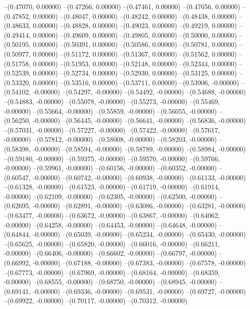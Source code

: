 --(0.47070, 0.00000)
--(0.47266, 0.00000)
--(0.47461, 0.00000)
--(0.47656, 0.00000)
--(0.47852, 0.00000)
--(0.48047, 0.00000)
--(0.48242, 0.00000)
--(0.48438, 0.00000)
--(0.48633, 0.00000)
--(0.48828, 0.00000)
--(0.49023, 0.00000)
--(0.49219, 0.00000)
--(0.49414, 0.00000)
--(0.49609, 0.00000)
--(0.49805, 0.00000)
--(0.50000, 0.00000)
--(0.50195, 0.00000)
--(0.50391, 0.00000)
--(0.50586, 0.00000)
--(0.50781, 0.00000)
--(0.50977, 0.00000)
--(0.51172, 0.00000)
--(0.51367, 0.00000)
--(0.51562, 0.00000)
--(0.51758, 0.00000)
--(0.51953, 0.00000)
--(0.52148, 0.00000)
--(0.52344, 0.00000)
--(0.52539, 0.00000)
--(0.52734, 0.00000)
--(0.52930, 0.00000)
--(0.53125, 0.00000)
--(0.53320, 0.00000)
--(0.53516, 0.00000)
--(0.53711, 0.00000)
--(0.53906, -0.00000)
--(0.54102, -0.00000)
--(0.54297, -0.00000)
--(0.54492, -0.00000)
--(0.54688, -0.00000)
--(0.54883, -0.00000)
--(0.55078, -0.00000)
--(0.55273, -0.00000)
--(0.55469, -0.00000)
--(0.55664, -0.00000)
--(0.55859, -0.00000)
--(0.56055, -0.00000)
--(0.56250, -0.00000)
--(0.56445, -0.00000)
--(0.56641, -0.00000)
--(0.56836, -0.00000)
--(0.57031, -0.00000)
--(0.57227, -0.00000)
--(0.57422, -0.00000)
--(0.57617, -0.00000)
--(0.57812, -0.00000)
--(0.58008, -0.00000)
--(0.58203, -0.00000)
--(0.58398, -0.00000)
--(0.58594, -0.00000)
--(0.58789, -0.00000)
--(0.58984, -0.00000)
--(0.59180, -0.00000)
--(0.59375, -0.00000)
--(0.59570, -0.00000)
--(0.59766, -0.00000)
--(0.59961, -0.00000)
--(0.60156, -0.00000)
--(0.60352, -0.00000)
--(0.60547, -0.00000)
--(0.60742, -0.00000)
--(0.60938, -0.00000)
--(0.61133, -0.00000)
--(0.61328, -0.00000)
--(0.61523, -0.00000)
--(0.61719, -0.00000)
--(0.61914, -0.00000)
--(0.62109, -0.00000)
--(0.62305, -0.00000)
--(0.62500, -0.00000)
--(0.62695, -0.00000)
--(0.62891, -0.00000)
--(0.63086, -0.00000)
--(0.63281, -0.00000)
--(0.63477, -0.00000)
--(0.63672, -0.00000)
--(0.63867, -0.00000)
--(0.64062, -0.00000)
--(0.64258, -0.00000)
--(0.64453, -0.00000)
--(0.64648, -0.00000)
--(0.64844, -0.00000)
--(0.65039, -0.00000)
--(0.65234, -0.00000)
--(0.65430, -0.00000)
--(0.65625, -0.00000)
--(0.65820, -0.00000)
--(0.66016, -0.00000)
--(0.66211, -0.00000)
--(0.66406, -0.00000)
--(0.66602, -0.00000)
--(0.66797, -0.00000)
--(0.66992, -0.00000)
--(0.67188, -0.00000)
--(0.67383, -0.00000)
--(0.67578, -0.00000)
--(0.67773, -0.00000)
--(0.67969, -0.00000)
--(0.68164, -0.00000)
--(0.68359, -0.00000)
--(0.68555, -0.00000)
--(0.68750, -0.00000)
--(0.68945, -0.00000)
--(0.69141, -0.00000)
--(0.69336, -0.00000)
--(0.69531, -0.00000)
--(0.69727, -0.00000)
--(0.69922, -0.00000)
--(0.70117, -0.00000)
--(0.70312, -0.00000)

